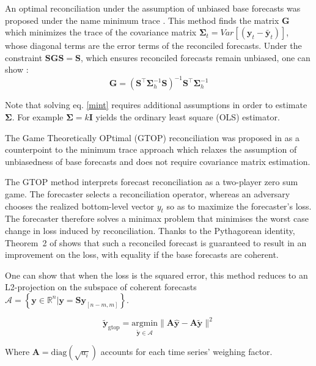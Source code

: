 \documentclass[letterpaper]{article}
\begin{document}
An optimal reconciliation under the assumption of unbiased base forecasts was proposed under the name minimum trace \cite{MinT}. 
This method finds the matrix $\mathbf{G}$ which minimizes the trace of the covariance matrix $\mathbf{\Sigma}_t = Var[(\mathbf{y}_t - \tilde{\mathbf{y}_t})]$, whose diagonal terms are the error terms of the reconciled forecasts. 
Under the constraint $\mathbf{SGS} = \mathbf{S}$, which ensures reconciled forecasts remain unbiased, one can show :
\begin{equation}
\mathbf{G}=(\mathbf{S}^{\top} \mathbf{\Sigma}_h^{-1}\mathbf{S})^{-1}\mathbf{S}^{\top}\mathbf{\Sigma}_h^{-1}
\label{mint}
\end{equation}

Note that solving eq. \ref{mint} requires additional assumptions in order to estimate $\mathbf{\Sigma}$. 
For example $\mathbf{\Sigma} = k\mathbf{I}$ yields the ordinary least square (OLS) estimator.

The Game Theoretically OPtimal (GTOP) reconciliation was proposed in \cite{gtop} as a counterpoint to the minimum trace approach which relaxes the assumption of unbiasedness of base forecasts and does not require covariance matrix estimation.

The GTOP method interprets forecast reconciliation as a two-player zero sum game.
The forecaster selects a reconciliation operator, whereas an adversary chooses the realized bottom-level vector $y_t$ so as to maximize the forecaster's loss. 
The forecaster therefore solves a minimax problem that minimises the worst case change in loss induced by reconciliation. 
Thanks to the Pythagorean identity, Theorem~2 of \cite{gtop} shows that such a reconciled forecast is guaranteed to result in an improvement on the loss, with equality if the base forecasts are coherent.

One can show that when the loss is the squared error, this method reduces to an L2-projection on the subspace of coherent forecasts $\mathcal{A} = \left\{\mathbf{y} \in \mathbb{R}^n | \mathbf{y}=\mathbf{S}\mathbf{y}_{[n-m,m]}\right\}$.

\begin{equation}
   \tilde{\mathbf{y}}_{\mathrm{gtop}} = \underset{\tilde{\mathbf{y}}\in \mathcal{A}}{\mathrm{arg}\mathrm{min}} \|\mathbf{A\hat{y}-A\tilde{y}}\|^2
\end{equation}

Where $\mathbf{A} = \mathrm{diag}(\sqrt{a_i})$ accounts for each time series' weighing factor.

\end{document}
